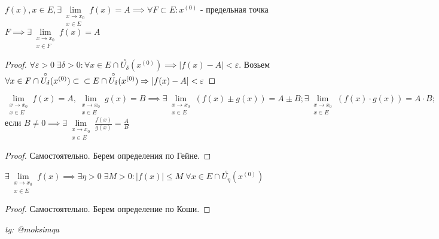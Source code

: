 \documentclass[../main.tex]{subfiles}
\begin{document}
\begin{theorem}
     $f(x),x\in E, \exists \lim\limits_{\substack{{x\to x_{0}}\\x\in E}}f(x) =A \implies \forall F \subset E: x^{(0)}$ - предельная точка $F\implies \exists \lim\limits_{\substack{{x\to x_{0}}\\ x\in F}}f(x)=A $
\end{theorem}
\begin{proof}
    $\forall \varepsilon>0 \; \exists \delta>0 : \forall x \in E \cap \overset{\circ}{U_{\delta}}(x^{(0)})\implies |f(x)-A|<\varepsilon$. Возьем $\forall x \in F \cap \overset{\circ}{U_{\delta}}(x^{(0)})\subset \\ \subset E \cap \overset{\circ}{U_{\delta}}(x^{(0)})\implies |f(x)-A| <\varepsilon$
\end{proof}
\begin{theorem}
    $\lim\limits_{\substack{x \to x_{0}\\x\in E}} f(x)=A , \lim\limits_{ \substack{x\to x_{0}\\x\in E}} g(x)=B  \implies \exists \lim\limits_{\substack{x\to x_{0}\\x\in E}} (f(x)\pm g(x))=A\pm B; \exists  \lim\limits_{\substack{x\to x_{0}\\x\in E}} (f(x)\cdot g(x))=A\cdot B;$ если $B\neq 0 \implies \exists \lim\limits_{\substack{x\to x_{0}\\ x\in E}} \frac{f(x)}{g(x)}=\frac{A}{B} $
\end{theorem}
\begin{proof}
    Самостоятельно. Берем определения по Гейне.
\end{proof}
\begin{theorem}
    $\exists \lim\limits_{\substack{x\to x_{0}\\ x\in E}} f(x) \implies \exists \eta > 0 \; \exists M>0: |f(x)| \leqslant M \; \forall x \in E \cap \overset{\circ}{U_{\eta}}(x^{(0)})$
\end{theorem}
\begin{proof}
    Самостоятельно. Берем определение по Коши.
\end{proof}
\vspace{1cm}
\begin{flushright}
    \textit{tg: @moksimqa}
\end{flushright}
\end{document}
